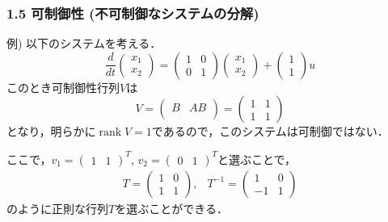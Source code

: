 \documentclass[10pt]{beamer}
\begin{document}
\begin{frame}[t]
\frametitle{1.5 可制御性 (不可制御なシステムの分解)}
例) 以下のシステムを考える．
\begin{equation}
 \frac{d}{dt}
  \left(
   \begin{array}{c}
    x_1 \\
    x_2
   \end{array}
  \right) =
  \left(
   \begin{array}{cc}
    1 & 0 \\
    0 & 1
   \end{array}
  \right)
  \left(
   \begin{array}{c}
    x_1 \\
    x_2
   \end{array}
  \right) +
  \left(
   \begin{array}{c}
    1 \\
    1
   \end{array}
  \right) u
\end{equation}
このとき可制御性行列$V$は
\begin{equation}
 V =
  \left(
   \begin{array}{cc}
    B & AB\\
   \end{array}
  \right) =
  \left(
   \begin{array}{cc}
    1 & 1 \\
    1 & 1
   \end{array}
  \right)
\end{equation}
となり，明らかに$\operatorname{rank} V = 1$であるので，このシステムは可制御ではない．

ここで，$v_1 = (\begin{array}{cc}1 & 1\end{array})^T$,
$v_2 = (\begin{array}{cc}0 & 1\end{array})^T$と選ぶことで，
\begin{equation}
 \begin{array}{cc}
  T =
   \left(
    \begin{array}{cc}
     1 & 0 \\
     1 & 1
    \end{array}
   \right),
   &
  T^{-1} =
   \left(
    \begin{array}{cc}
     1 & 0 \\
     -1 & 1
    \end{array}
   \right)
 \end{array}
\end{equation}
のように正則な行列$T$を選ぶことができる．
\end{frame}
\end{document}
